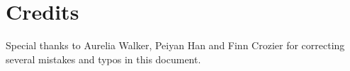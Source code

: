 \section{Credits}

Special thanks to Aurelia Walker, Peiyan Han and Finn Crozier for correcting several mistakes and typos in this document.